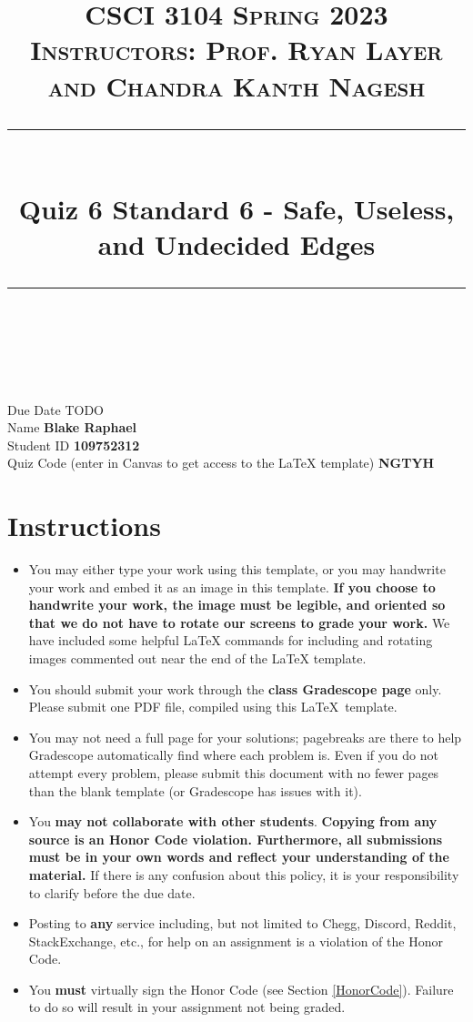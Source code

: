 \documentclass[11pt]{article}
\title{
\normalfont \normalsize 
\textsc{CSCI 3104 Spring 2023 \\ 
Instructors: Prof. Ryan Layer and Chandra Kanth Nagesh} \\
[10pt] 
\rule{\linewidth}{0.5pt} \\[6pt] 
\huge Quiz 6 Standard 6 - Safe, Useless, and Undecided Edges \\
\rule{\linewidth}{2pt}  \\[10pt]
}
\date{}
\theoremstyle{definition}
\theoremstyle{definition}
\theoremstyle{definition}
\begin{document}

\maketitle


\noindent
Due Date \dotfill TODO \\
Name \dotfill \textbf{Blake Raphael} \\
Student ID \dotfill \textbf{109752312} \\
Quiz Code (enter in Canvas to get access to the LaTeX template) \dotfill \textbf{NGTYH}


\tableofcontents

\section*{Instructions}
 \begin{itemize}
	\item You may either type your work using this template, or you may handwrite your work and embed it as an image in this template. \textbf{If you choose to handwrite your work, the image must be legible, and oriented so that we do not have to rotate our screens to grade your work.} We have included some helpful LaTeX commands for including and rotating images commented out near the end of the LaTeX template.
	\item You should submit your work through the \textbf{class Gradescope page} only. Please submit one PDF file, compiled using this \LaTeX \ template.
	\item You may not need a full page for your solutions; pagebreaks are there to help Gradescope automatically find where each problem is. Even if you do not attempt every problem, please submit this document with no fewer pages than the blank template (or Gradescope has issues with it).

	\item You \textbf{may not collaborate with other students}. \textbf{Copying from any source is an Honor Code violation. Furthermore, all submissions must be in your own words and reflect your understanding of the material.} If there is any confusion about this policy, it is your responsibility to clarify before the due date. 

	\item Posting to \textbf{any} service including, but not limited to Chegg, Discord, Reddit, StackExchange, etc., for help on an assignment is a violation of the Honor Code.

	\item You \textbf{must} virtually sign the Honor Code (see Section \ref{HonorCode}). Failure to do so will result in your assignment not being graded.
\end{itemize}
\end{document}
